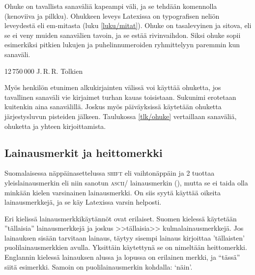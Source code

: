 Ohuke on tavallista sanaväliä kapeampi väli, ja se tehdään
komennolla~\komentom{,} (kenoviiva ja pilkku). Ohukkeen leveys Latexissa
on  typografisen neliön leveydestä eli em-mitasta (luku
\ref{luku/mitat}). Ohuke on tasalevyinen ja sitova, eli se ei veny
muiden sanavälien tavoin, ja se estää rivinvaihdon. Siksi ohuke sopii
esimerkiksi pitkien lukujen ja puhelinnumeroiden ryhmittelyyn paremmin
kun sanaväli.

\komentoi{,}
\begin{koodilohkosis}
12\,750\,000
J.\,R.\,R. Tolkien
\end{koodilohkosis}

\noindent
Myös henkilön etunimen alkukirjainten välissä voi käyttää ohuketta, jos
tavallinen sanaväli vie kirjaimet turhan kauas toisistaan. Sukunimi
erotetaan kuitenkin aina sanavälillä. Joskus myös päiväyksissä käytetään
ohuketta järjestysluvun pisteiden jälkeen. Taulukossa \ref{tlk/ohuke}
vertaillaan sanaväliä, ohuketta ja yhteen kirjoittamista.


\subsection{Lainausmerkit ja heittomerkki}
\label{luku/lainausmerkit}

Suomalaisessa näppäinasettelussa \textsc{shift} eli vaihtonäppäin ja 2
tuottaa yleislainausmerkin eli niin sanotun \textsc{ascii}\-/
lainausmerkin (\textquotedbl), mutta se ei taida olla minkään kielen
varsinainen lainausmerkki. On siis syytä käyttää oikeita
lainausmerkkejä, ja se käy Latexissa varsin helposti.

Eri kielissä lainausmerkkikäytännöt ovat erilaiset. Suomen kielessä
käytetään ''tällaisia'' lainausmerkkejä ja joskus >>tällaisia>>
kulmalainausmerkkejä. Jos lainauksen sisään tarvitaan lainaus, täytyy
sisempi lainaus kirjoittaa 'tällaisten' puolilainausmerkkien avulla.
Yksittäin käytettynä se on nimeltään heittomerkki. Englannin kielessä
lainauksen alussa ja lopussa on erilainen merkki, ja ``tässä'' siitä
esimerkki. Samoin on puolilainausmerkin kohdalla: `näin'.

